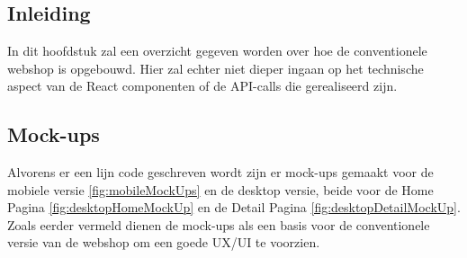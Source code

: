 
\chapter{}%
\label{ch:proofofconceptConventioneel}

\section{Inleiding}

In dit hoofdstuk zal een overzicht gegeven worden over hoe de conventionele webshop is opgebouwd. Hier zal echter niet dieper ingaan op het technische aspect van de React componenten of de API-calls die gerealiseerd zijn.

\section{Mock-ups}

Alvorens er een lijn code geschreven wordt zijn er mock-ups gemaakt voor de mobiele versie \ref{fig:mobileMockUps} en de desktop versie, beide voor de Home Pagina \ref{fig:desktopHomeMockUp} en de Detail Pagina \ref{fig:desktopDetailMockUp}. Zoals eerder vermeld dienen de mock-ups als een basis voor de conventionele versie van de webshop om een goede UX/UI te voorzien.

